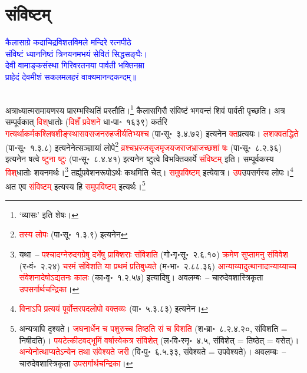 \section[संविष्टम्]{संविष्टम्}
\centering\textcolor{blue}{कैलासाग्रे कदाचिद्रविशतविमले मन्दिरे रत्नपीठे\nopagebreak\\
संविष्टं ध्याननिष्ठं त्रिनयनमभयं सेवितं सिद्धसङ्घैः।\nopagebreak\\
देवी वामाङ्कसंस्था गिरिवरतनया पार्वती भक्तिनम्रा\nopagebreak\\
प्राहेदं देवमीशं सकलमलहरं वाक्यमानन्दकन्दम्॥}\nopagebreak\\
\\
\begin{sloppypar}\justifying\noindent\hspace{10mm} अत्राध्यात्म\-रामायणस्य प्रारम्भ\-स्थितिं प्रस्तौति।\footnote{‘व्यासः’ इति शेषः।} कैलास\-गिरौ संविष्टं भगवन्तं शिवं पार्वती पृच्छति। अत्र सम्पूर्वकात् \textcolor{red}{विश्‌}\-धातोः (\textcolor{red}{विशँ प्रवेशने} धा॰पा॰~१६३९) कर्तरि \textcolor{red}{गत्यर्थाकर्मक\-श्लिष\-शीङ्स्थास\-वस\-जन\-रुह\-जी\-र्यतिभ्यश्च} (पा॰सू॰~३.४.७२) इत्यनेन \textcolor{red}{क्त}\-प्रत्ययः। \textcolor{red}{लशक्वतद्धिते} (पा॰सू॰~१.३.८) इत्यनेनेत्सञ्ज्ञायां लोपे\footnote{\textcolor{red}{तस्य लोपः} (पा॰सू॰~१.३.९) इत्यनेन} \textcolor{red}{व्रश्च\-भ्रस्ज\-सृज\-मृज\-यज\-राज\-भ्राजच्छशां षः} (पा॰सू॰~८.२.३६) इत्यनेन षत्वे \textcolor{red}{ष्टुना ष्टुः} (पा॰सू॰~८.४.४१) इत्यनेन ष्टुत्वे विभक्ति\-कार्ये \textcolor{red}{संविष्टम्} इति। सम्पूर्वकस्य \textcolor{red}{विश्‌}\-धातोः शयनमर्थः।\footnote{यथा~– \textcolor{red}{पश्चादग्नेरुदगग्रेषु दर्भेषु प्राक्शिराः संविशति} (गो॰गृ॰सू॰~२.६.१०) \textcolor{red}{क्रमेण सुप्तामनु संविवेश} (र॰वं॰~२.२४) \textcolor{red}{चरमं संविशति या प्रथमं प्रतिबुध्यते} (म॰भा॰~२.८८.३६) \textcolor{red}{आन्याय्यादुत्थानादान्याय्याच्च संवेशनादेषोऽद्यतनः कालः} (का॰वृ॰~१.२.५७) इत्यादिषु। अवलम्बः~– चारुदेवशास्त्रिकृता \textcolor{red}{उपसर्गार्थचन्द्रिका}।} तर्ह्युपवेशन\-रूपोऽर्थः कथमिति चेत्। \textcolor{red}{समुपविष्टम्} इत्येवात्र।
\textcolor{red}{उप}\-उपसर्गस्य लोपः।\footnote{\textcolor{red}{विनाऽपि प्रत्ययं पूर्वोत्तर\-पद\-लोपो वक्तव्यः} (वा॰~५.३.८३) इत्यनेन।} अत एव \textcolor{red}{संविष्टम्} इत्यस्य हि \textcolor{red}{समुपविष्टम्} इत्यर्थः।\footnote{अन्यत्रापि दृश्यते। \textcolor{red}{जघनार्धेन च पशुरुच्च तिष्ठति सं च विशति} (श॰ब्रा॰~८.२.४.२०, संविशति = निषीदति)। \textcolor{red}{पयटेत्कीटवद्भूमिं वर्षास्वेकत्र संविशेत्} (ल॰वि॰स्मृ॰~४.५, संविशेत् = तिष्ठेत् = वसेत्)। \textcolor{red}{अन्येनोत्थाप्यतेऽन्येन तथा संवेश्यते जरी} (वि॰पु॰~६.५.३३, संवेश्यते = उपवेश्यते)। अवलम्बः~– चारुदेवशास्त्रिकृता \textcolor{red}{उपसर्गार्थचन्द्रिका}।}\end{sloppypar}

